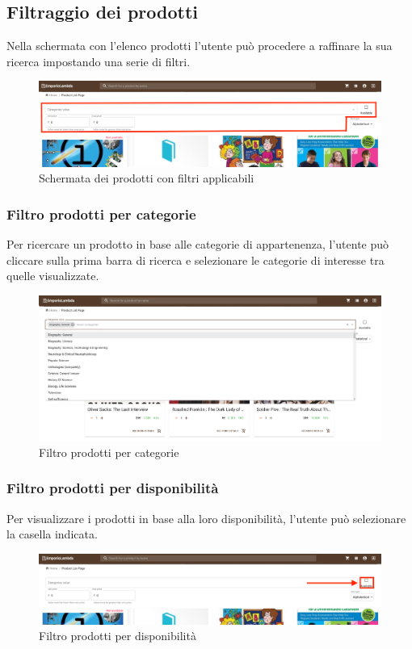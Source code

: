 \subsection{Filtraggio dei prodotti}
Nella schermata con l'elenco prodotti l'utente può procedere a raffinare la sua ricerca impostando una serie di filtri.
\begin{figure}[H]
	\centering
	\includegraphics[scale=0.25]{Immagini/Acquirente/plp-filter.customer.png}
	\caption{Schermata dei prodotti con filtri applicabili}
	\label{fig:PLPfiltri}
\end{figure}
\subsubsection{Filtro prodotti per categorie}
Per ricercare un prodotto in base alle categorie di appartenenza, l'utente può cliccare sulla prima barra di ricerca e selezionare le categorie di interesse tra quelle visualizzate.
\begin{figure}[H]
	\centering
	\includegraphics[scale=0.25]{Immagini/Acquirente/plp-categories-open.png}
	\caption{Filtro prodotti per categorie}
	\label{fig:PLPcategorie}
\end{figure}
\subsubsection{Filtro prodotti per disponibilità}
Per visualizzare i prodotti in base alla loro disponibilità, l'utente può selezionare la casella indicata.
\begin{figure}[H]
	\centering
	\includegraphics[scale=0.25]{Immagini/Acquirente/plp-available.png}
	\caption{Filtro prodotti per disponibilità}
	\label{fig:PLPdisponibilità}
\end{figure}
